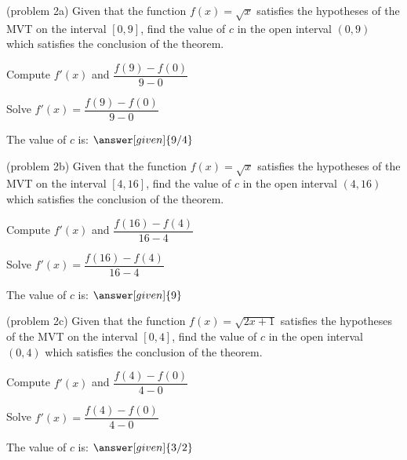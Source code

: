 \documentclass{ximera}
\begin{document}
\begin{problem}(problem 2a)
  Given that the function $f(x) = \sqrt x$ satisfies the hypotheses of the MVT on the
	interval $[0,9]$, find the value of $c$ in the open interval $(0,9)$ which satisfies 
	the conclusion of the theorem.
	
    \begin{hint}
      Compute $f'(x)$ and $\dfrac{f(9) - f(0)}{9-0}$
    \end{hint}
		\begin{hint}
		  Solve $f'(x) = \dfrac{f(9) - f(0)}{9-0}$
		\end{hint}
		
		The value of $c$ is:
		 $\answer[given]{9/4}$
\end{problem}


\begin{problem}(problem 2b)
  Given that the function $f(x) = \sqrt x$ satisfies the hypotheses of the MVT on the
	interval $[4,16]$, find the value of $c$ in the open interval $(4,16)$ which satisfies 
	the conclusion of the theorem.
	
    \begin{hint}
      Compute $f'(x)$ and $\dfrac{f(16) - f(4)}{16-4}$
    \end{hint}
		\begin{hint}
		  Solve $f'(x) = \dfrac{f(16) - f(4)}{16-4}$
		\end{hint}
		
		The value of $c$ is:
		 $\answer[given]{9}$
\end{problem}


\begin{problem}(problem 2c)
  Given that the function $f(x) = \sqrt{2x+1}$ satisfies the hypotheses of the MVT on the
	interval $[0,4]$, find the value of $c$ in the open interval $(0,4)$ which satisfies 
	the conclusion of the theorem.
	
    \begin{hint}
      Compute $f'(x)$ and $\dfrac{f(4) - f(0)}{4-0}$
    \end{hint}
		\begin{hint}
		  Solve $f'(x) = \dfrac{f(4) - f(0)}{4-0}$
		\end{hint}
		
		The value of $c$ is:
		 $\answer[given]{3/2}$
\end{problem}
\end{document}
